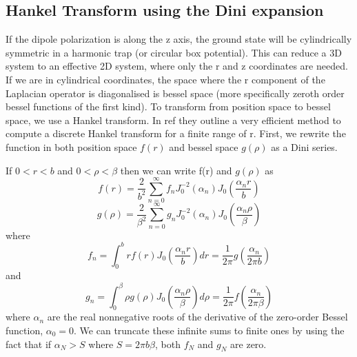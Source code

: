 \documentclass[10pt]{article}
\numberwithin{equation}{section}
\begin{document}
\begin{multicols}{2}
\section{Hankel Transform using the Dini expansion}
If the dipole polarization is along the z axis, the ground state will be cylindrically symmetric in a harmonic trap (or circular box potential). This can reduce a 3D system to an effective 2D system, where only the r and z coordinates are needed. If we are in cylindrical coordinates, the space where the r component of the Laplacian operator is diagonalised is bessel space (more specifically zeroth order bessel functions of the first kind). To transform from position space to bessel space, we use a Hankel transform. In ref \cite{Kai_Ming_2009} they outline a very efficient method to compute a discrete Hankel transform for a finite range of r. 
First, we rewrite the function in both position space $f(r)$ and bessel space $g(\rho)$ as a Dini series. 



If $0<r<b$ and $0<\rho<\beta$ then we can write f(r) and $g(\rho)$ as
\begin{equation}
f(r) = \frac{2}{b^{2}}\sum_{n=0}^{\infty}f_{n}J_{0}^{-2}(\alpha_{n})J_{0}(\frac{\alpha_{n}r}{b})
\end{equation}
\begin{equation}
g(\rho) = \frac{2}{\beta^{2}}\sum_{n=0}^{\infty}g_{n}J_{0}^{-2}(\alpha_{n})J_{0}(\frac{\alpha_{n}\rho}{\beta})
\end{equation}
where 
\begin{equation}
f_{n} = \int_{0}^{b}rf(r)J_{0}(\frac{\alpha_{n}r}{b})dr=\frac{1}{2\pi}g(\frac{\alpha_{n}}{2\pi b})
\end{equation}
and
\begin{equation}
g_{n} = \int_{0}^{\beta}\rho g(\rho)J_{0}(\frac{\alpha_{n}\rho}{\beta})d\rho=\frac{1}{2\pi}f(\frac{\alpha_{n}}{2\pi\beta})
\end{equation}
where $\alpha_{n}$ are the real nonnegative roots of the derivative of the zero-order Bessel function, $\alpha_{0}=0$. We can truncate these infinite sums to finite ones by using the fact that if $\alpha_{N} >S$ where $S=2\pi b\beta$, both $f_{N}$ and $g_{N}$ are zero.


\end{multicols}
\end{document}
